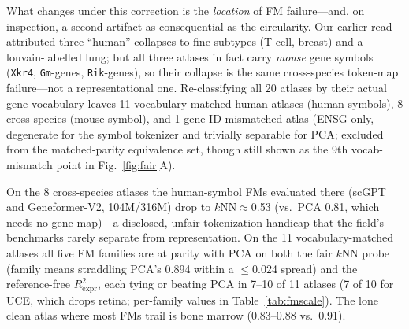 \documentclass[11pt]{article}
\begin{document}
What changes under this correction is the \emph{location} of FM failure---and, on inspection, a second artifact as consequential as the circularity. Our earlier read attributed three ``human'' collapses to fine subtypes (T-cell, breast) and a louvain-labelled lung; but all three atlases in fact carry \emph{mouse} gene symbols (\texttt{Xkr4}, \texttt{Gm}-genes, \texttt{Rik}-genes), so their collapse is the same cross-species token-map failure---not a representational one. Re-classifying all 20 atlases by their actual gene vocabulary leaves 11 vocabulary-matched human atlases (human symbols), 8 cross-species (mouse-symbol), and 1 gene-ID-mismatched atlas (ENSG-only, degenerate for the symbol tokenizer and trivially separable for PCA; excluded from the matched-parity equivalence set, though still shown as the 9th vocab-mismatch point in Fig.~\ref{fig:fair}A).

On the 8 cross-species atlases the human-symbol FMs evaluated there (scGPT and Geneformer-V2, 104M/316M) drop to $k$NN${\approx}$0.53 (vs.\ PCA 0.81, which needs no gene map)---a disclosed, unfair tokenization handicap that the field's benchmarks rarely separate from representation. On the 11 vocabulary-matched atlases all five FM families are at parity with PCA on both the fair $k$NN probe (family means straddling PCA's 0.894 within a $\le$0.024 spread) and the reference-free $R^2_{\mathrm{expr}}$, each tying or beating PCA in 7--10 of 11 atlases (7 of 10 for UCE, which drops retina; per-family values in Table~\ref{tab:fmscale}). The lone clean atlas where most FMs trail is bone marrow (0.83--0.88 vs.\ 0.91).
\end{document}
